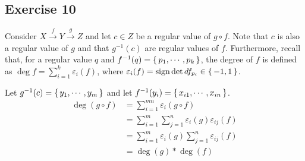 \documentclass{article}
\begin{document}
  \subsection*{Exercise 10}
    Consider $X\xrightarrow{f}Y\xrightarrow{g}Z$ and let $c\in Z$ be a regular
    value of $g\circ f$. Note that $c$ is also a regular value of $g$ and that
    $g^{-1}(c)$ are regular values of $f$. Furthermore, recall that, for a
    regular value $q$ and $f^{-1}(q)=\set{p_1,\cdots,p_k}$, the degree of $f$ is
    defined as $\deg f=\sum_{i=1}^k\varepsilon_i(f)$, where $\varepsilon_i(f)=
    \text{sign}\det df_{p_i}\in\set{-1,1}$.

    Let $g^{-1}(c)=\set{y_1,\cdots,y_m}$ and let $f^{-1}(y_i)=\set{x_{i1},\cdots,
    x_{in}}$.
    \begin{align*}
      \deg(g\circ f)
        &=\sum_{i=1}^{mn}\varepsilon_i(g\circ f)\\
        &=\sum_{i=1}^m\sum_{j=1}^n\varepsilon_i(g)\varepsilon_{ij}(f)\\
        &=\sum_{i=1}^m\varepsilon_i(g)\sum_{j=1}^n\varepsilon_{ij}(f)\\
        &=\deg(g)*\deg(f)
        \tag*{\qed}
    \end{align*}
\end{document}
